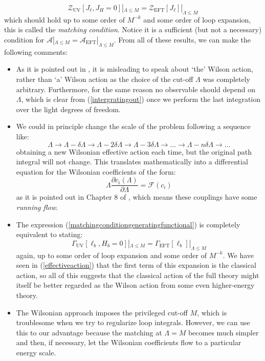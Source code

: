 \documentclass[11pt]{article}
\begin{document}
\begin{equation}\label{matchingconditiongeneratingfunctional}
    \mathcal{Z}_{\text{UV}}[J_\ell,J_H=0]|_{\Lambda\le M}=\mathcal{Z}_{\text{EFT}}[J_\ell]|_{\Lambda\le M}
\end{equation}
which should hold up to some order of $M^{-k}$ and some order of loop expansion, this is called the \textit{matching condition}. Notice it is a sufficient (but not a necessary) condition for $\mathcal{A}|_{\Lambda\le M}=\mathcal{A}_{\text{EFT}}|_{\Lambda\le M}$. From all of these results, we can make the following comments:
\begin{itemize}
    \item As it is pointed out in \cite{Burgess_2007}, it is misleading to speak about ‘the’ Wilson
    action, rather than ‘a’ Wilson action as the choice of the cut-off $\Lambda$ was completely arbitrary. Furthermore, for the same reason no observable should depend on $\Lambda$, which is clear from (\ref{intergratingout}) once we perform the last integration over the light degrees of freedom.
    \item We could in principle change the scale of the problem following a sequence like:
    \begin{equation}
        \Lambda\to \Lambda-\delta\Lambda\to \Lambda-2\delta\Lambda\to \Lambda-3\delta\Lambda\to \ldots\to  \Lambda-n\delta\Lambda\to \ldots
    \end{equation}
    obtaining a new Wilsonian effective action each time, but the original path integral will not change. This translates mathematically into a differential equation for the Wilsonian coefficients of the form:
    \begin{equation}
        \Lambda \dfrac{\partial c_i(\Lambda)}{\partial\Lambda}=\mathcal{F}(c_i)
    \end{equation}
    as it is pointed out in Chapter 8 of \cite{Peskin:1995ev}, which means these couplings have some \textit{running flow}.
    \item The expression (\ref{matchingconditiongeneratingfunctional}) is completely equivalent to stating:
    \begin{equation}
         \Gamma_{\text{UV}}[\ell_b,H_b=0]|_{\Lambda\le M}=\Gamma_{\text{EFT}}[\ell_b]|_{\Lambda\le M}
    \end{equation}
    again, up to some order of loop expansion and some order of $M^{-k}$.  We have seen in (\ref{effectiveaction}) that the first term of this expansion is the classical action, so all of this suggests that the classical action of the full theory might itself be better regarded as the Wilson action from some even higher-energy theory.
    \item The Wilsonian approach imposes the privileged cut-off $M$, which is troublesome when we try to regularize loop integrals. However, we can use this to our advantage because the matching at $\Lambda=M$ becomes much simpler \cite{Falkowski} and then, if necessary, let the Wilsonian coefficients flow to a particular energy scale.
\end{itemize}
\end{document}
